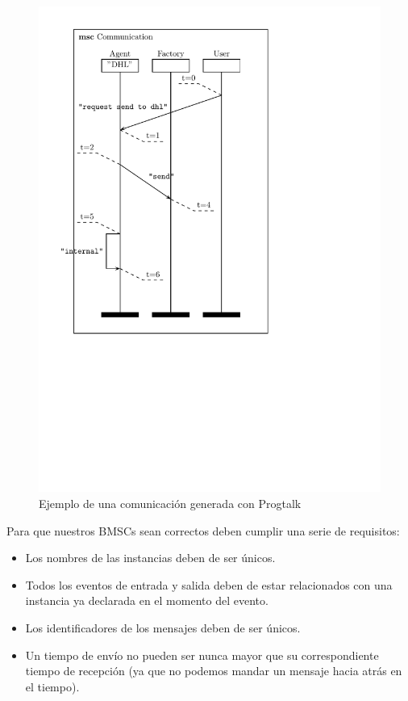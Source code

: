 \begin{figure}
  \centering
  \includegraphics[scale=1]{./images/lars}
  \caption{Ejemplo de una comunicación generada con Progtalk}
  \label{fig:fig5}
\end{figure}

Para que nuestros BMSCs sean correctos deben cumplir una serie de requisitos:
\begin{itemize}
\item Los nombres de las instancias deben de ser únicos.
\item Todos los eventos de entrada y salida deben de estar
  relacionados con una instancia ya declarada en el momento del
  evento.
\item Los identificadores de los mensajes deben de ser únicos.
\item Un tiempo de envío no pueden ser nunca mayor que su
  correspondiente tiempo de recepción (ya que no podemos mandar un
  mensaje hacia atrás en el tiempo).
\end{itemize}


